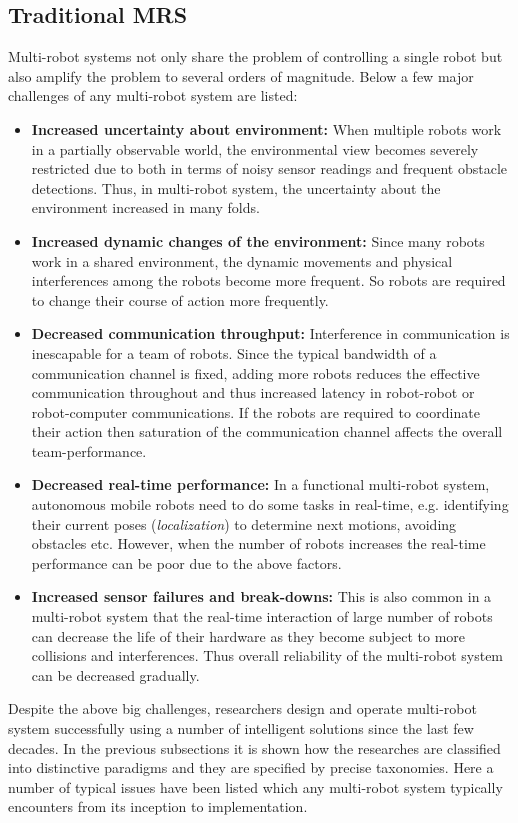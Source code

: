 \subsection{Traditional MRS}
\label{bg:mrs:mrs}
Multi-robot systems not only share the problem of controlling a single robot but also amplify the problem to several orders of magnitude. Below a few major challenges of any multi-robot system are listed:
\begin{itemize}
\item \textbf{Increased uncertainty about environment:}
When multiple robots work in a partially observable world, the environmental view becomes severely restricted due to both in terms of noisy sensor readings and frequent obstacle detections. Thus, in multi-robot system, the uncertainty about the environment increased in many folds.
%
\item \textbf{Increased dynamic changes of the environment:}
Since many robots work in a shared environment, the dynamic movements and physical interferences among the robots become more frequent. So robots are required to change their course of action more frequently.
% 
\item \textbf{Decreased communication throughput:}
Interference in communication is inescapable for a team of robots. Since the typical bandwidth of a communication channel is fixed, adding more robots reduces the effective communication throughout and thus increased latency in robot-robot or robot-computer communications. If the robots are required to coordinate their action then  saturation of the communication channel affects the overall team-performance.
%
\item \textbf{Decreased real-time performance:}
In a functional multi-robot system, autonomous mobile robots need to do some tasks in real-time, e.g. identifying their current poses ({\em localization}) to determine next motions, avoiding obstacles etc. However, when the number of robots increases the real-time performance can be poor due to the above factors.
%
\item \textbf{Increased sensor failures and break-downs:}
This is also common in a multi-robot system that the real-time interaction of large number of robots can decrease the life of their hardware as they become subject to more collisions and interferences. Thus overall reliability of the multi-robot system can be decreased gradually.
\end{itemize}
Despite the above big challenges, researchers design and operate multi-robot system successfully using a number of intelligent solutions since the last few decades. In the previous subsections it  is shown how the researches are classified into distinctive paradigms and they are specified by precise taxonomies. Here a number of typical issues have been listed which any multi-robot system typically encounters from its inception to implementation.
